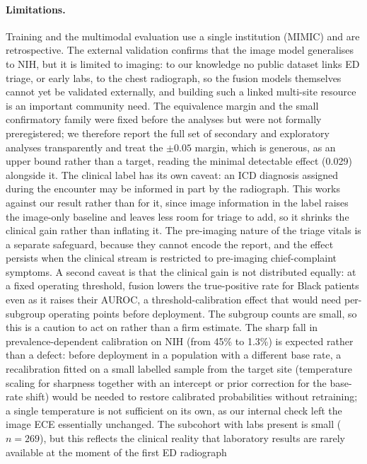 \documentclass[twocolumn, final]{svjour3}
\begin{document}
\paragraph{Limitations.} Training and the multimodal evaluation use a single
institution (MIMIC) and are retrospective. The external validation confirms that the
image model generalises to NIH, but it is limited to imaging: to our knowledge no
public dataset links ED triage, or early labs, to the chest radiograph, so the fusion
models themselves cannot yet be validated externally, and building such a linked
multi-site resource is an important community need. The equivalence margin and the small
confirmatory family were fixed before the analyses but were not formally preregistered; we
therefore report the full set of secondary and exploratory analyses transparently and treat the
$\pm0.05$ margin, which is generous, as an upper bound rather than a target, reading the minimal
detectable effect (0.029) alongside it. The clinical label has its own
caveat: an ICD diagnosis assigned during the encounter may be informed in part by the
radiograph. This works against our result rather than for it, since image information in the
label raises the image-only baseline and leaves less room for triage to add, so it shrinks
the clinical gain rather than inflating it. The pre-imaging nature of the triage vitals is a
separate safeguard, because they cannot encode the report, and the effect persists when the
clinical stream is restricted to pre-imaging chief-complaint symptoms. A second caveat
is that the clinical gain is not distributed equally: at a fixed operating threshold,
fusion lowers the true-positive rate for Black patients even as it raises their AUROC, a
threshold-calibration effect that would need per-subgroup operating points before
deployment. The subgroup counts are small, so this is a caution to act on rather than a
firm estimate. The sharp fall in
prevalence-dependent calibration on NIH (from 45\% to 1.3\%) is expected rather than a
defect: before deployment in a population with a different base rate, a recalibration
fitted on a small labelled sample from the target site (temperature scaling for sharpness
together with an intercept or prior correction for the base-rate shift) would be needed to
restore calibrated probabilities without retraining; a single temperature is not
sufficient on its own, as our internal check left the image ECE essentially unchanged. The subcohort
with labs present is small ($n{=}269$), but this reflects the clinical reality that
laboratory results are rarely available at the moment of the first ED radiograph
\end{document}
